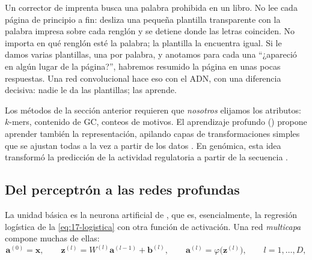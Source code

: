 \begin{intuicion}
Un corrector de imprenta busca una palabra prohibida en un libro. No lee cada página de principio a fin: desliza una pequeña plantilla transparente con la palabra impresa sobre cada renglón y se detiene donde las letras coinciden. No importa en qué renglón esté la palabra; la plantilla la encuentra igual. Si le damos varias plantillas, una por palabra, y anotamos para cada una ``¿apareció en algún lugar de la página?'', habremos resumido la página en unas pocas respuestas. Una red convolucional hace eso con el ADN, con una diferencia decisiva: nadie le da las plantillas; las aprende.
\end{intuicion}

Los métodos de la sección anterior requieren que \emph{nosotros} elijamos los atributos: $k$-mers, contenido de GC, conteos de motivos. El aprendizaje profundo () propone aprender también la representación, apilando capas de transformaciones simples que se ajustan todas a la vez a partir de los datos \parencite{c17-lecun2015}. En genómica, esta idea transformó la predicción de la actividad regulatoria a partir de la secuencia \parencite{c17-eraslan2019}.

\subsection{Del perceptrón a las redes profundas}

La unidad básica es la neurona artificial de \textcite{c17-rosenblatt1958}, que es, esencialmente, la regresión logística de la \cref{eq:17-logistica} con otra función de activación. Una red \emph{multicapa} compone muchas de ellas:
\begin{equation}\label{eq:17-capas}
\mathbf{a}^{(0)}=\mathbf{x},\qquad
\mathbf{z}^{(l)} = W^{(l)}\mathbf{a}^{(l-1)} + \mathbf{b}^{(l)},\qquad
\mathbf{a}^{(l)} = \varphi\big(\mathbf{z}^{(l)}\big),\qquad l=1,\dots,D,
\end{equation}

\begin{simbolos}
\end{simbolos}

